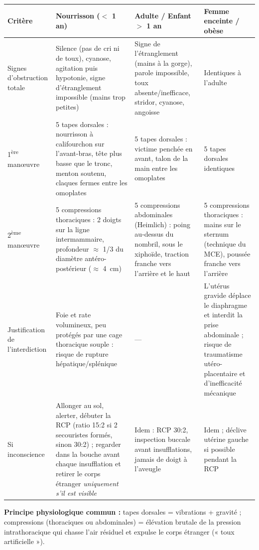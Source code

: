 \documentclass[11pt]{article}
\begin{document}
\begin{corrige}
\begin{center}
\begin{tabularx}{\linewidth}{|l|X|X|X|}
\hline
\rowcolor{popblueL}
\textbf{Critère} & \textbf{Nourrisson ($<$ 1 an)} & \textbf{Adulte / Enfant $>$ 1 an} & \textbf{Femme enceinte / obèse} \\
\hline
Signes d'obstruction totale & Silence (pas de cri ni de toux), cyanose, agitation puis hypotonie, signe d'étranglement impossible (mains trop petites) & Signe de l'étranglement (mains à la gorge), parole impossible, toux absente/inefficace, stridor, cyanose, angoisse & Identiques à l'adulte \\
\hline
1\textsuperscript{ère} manœuvre & 5 tapes dorsales : nourrisson à califourchon sur l'avant-bras, tête plus basse que le tronc, menton soutenu, claques fermes entre les omoplates & 5 tapes dorsales : victime penchée en avant, talon de la main entre les omoplates & 5 tapes dorsales identiques \\
\hline
2\textsuperscript{ème} manœuvre & 5 compressions thoraciques : 2 doigts sur la ligne intermammaire, profondeur $\approx$ 1/3 du diamètre antéro-postérieur ($\approx$ \SI{4}{cm}) & 5 compressions abdominales (Heimlich) : poing au-dessus du nombril, sous le xiphoïde, traction franche vers l'arrière et le haut & 5 compressions thoraciques : mains sur le sternum (technique du MCE), poussée franche vers l'arrière \\
\hline
Justification de l'interdiction & Foie et rate volumineux, peu protégés par une cage thoracique souple : risque de rupture hépatique/splénique & — & L'utérus gravide déplace le diaphragme et interdit la prise abdominale ; risque de traumatisme utéro-placentaire et d'inefficacité mécanique \\
\hline
Si inconscience & Allonger au sol, alerter, débuter la RCP (ratio 15:2 si 2 secouristes formés, sinon 30:2) ; regarder dans la bouche avant chaque insufflation et retirer le corps étranger \emph{uniquement s'il est visible} & Idem : RCP 30:2, inspection buccale avant insufflations, jamais de doigt à l'aveugle & Idem ; déclive utérine gauche si possible pendant la RCP \\
\hline
\end{tabularx}
\end{center}
\textbf{Principe physiologique commun :} tapes dorsales = vibrations + gravité ; compressions (thoraciques ou abdominales) = élévation brutale de la pression intrathoracique qui chasse l'air résiduel et expulse le corps étranger (« toux artificielle »).
\end{corrige}
\end{document}
